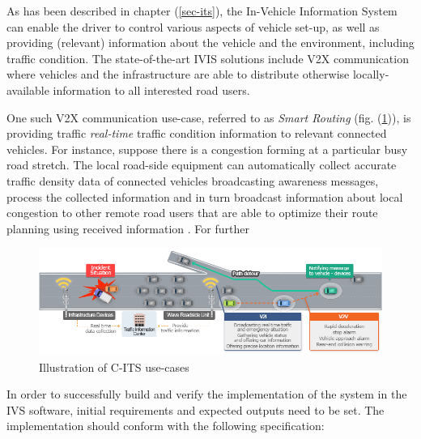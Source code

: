 \documentclass[main.tex]{subfiles}
\begin{document}
As has been described in chapter (\ref{sec-its}), the In-Vehicle Information System can enable 
the driver to control various aspects of vehicle set-up, as well as providing (relevant) information about 
the vehicle and the environment, including traffic condition. The state-of-the-art IVIS solutions include 
V2X communication where vehicles and the infrastructure are able to distribute otherwise locally-available 
information to all interested road users. 

One such V2X communication use-case, referred to as \emph{Smart Routing} (fig.
(\ref{cits-ivis})), is providing traffic \emph{real-time} traffic condition information to
relevant connected vehicles. For instance, suppose there is a congestion forming at a
particular busy road stretch. The local road-side equipment can automatically collect accurate
traffic density data of connected vehicles broadcasting awareness messages, process the
collected information and in turn broadcast information about local congestion to other remote
road users that are able to optimize their route planning using received information
\cite{Kotsi2020}. For further 

\begin{figure}[htbp]
    \centering
    \includegraphics[width=.8\textwidth]{cits-ivis.png}
    \caption{Illustration of C-ITS use-cases}
    \label{cits-ivis}
\end{figure}

In order to successfully build and verify the implementation of the system in the IVS software, 
initial requirements and expected outputs need to be set. The implementation should conform with 
the following specification:
\end{document}
